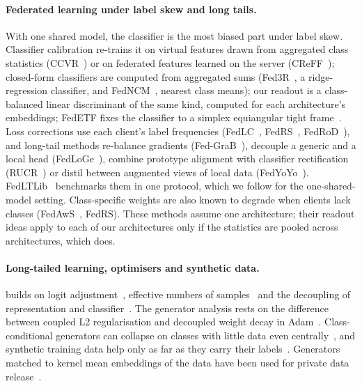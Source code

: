 \paragraph{Federated learning under label skew and long tails.} With one shared model, the classifier is the most
biased part under label skew. Classifier calibration re-trains it on virtual features drawn from aggregated class
statistics (CCVR~\cite{luo2021ccvr}) or on federated features learned on the server (CReFF~\cite{shang2022creff});
closed-form classifiers are computed from aggregated sums (Fed3R~\cite{fani2024fed3r}, a ridge-regression classifier,
and FedNCM~\cite{legate2023fedncm}, nearest class means); our readout is a class-balanced linear discriminant of the same
kind, computed for each architecture's embeddings; FedETF fixes the classifier to a simplex equiangular tight
frame~\cite{li2023fedetf}. Loss corrections use each client's label frequencies (FedLC~\cite{zhang2022fedlc},
FedRS~\cite{li2021fedrs}, FedRoD~\cite{chen2022fedrod}), and long-tail methods re-balance gradients
(Fed-GraB~\cite{xiao2023fedgrab}), decouple a generic and a local head (FedLoGe~\cite{xiao2024fedloge}), combine prototype
alignment with classifier rectification (RUCR~\cite{huang2024rucr}) or distil between augmented views of local data
(FedYoYo~\cite{yan2025fedyoyo}). FedLTLib~\cite{lin2026fedltlib} benchmarks them in one protocol, which we follow for
the one-shared-model setting. Class-specific weights are also known to degrade when clients lack classes
(FedAwS~\cite{yu2020fedaws}, FedRS). These methods assume one architecture; their readout ideas apply to each of our
architectures only if the statistics are pooled across architectures, which \ours does.

\paragraph{Long-tailed learning, optimisers and synthetic data.} \ours builds on logit adjustment~\cite{menon2021la},
effective numbers of samples~\cite{cui2019cb} and the decoupling of representation and
classifier~\cite{kang2020decoupling}. The generator analysis rests on the difference between coupled L2 regularisation
and decoupled weight decay in Adam~\cite{loshchilov2019adamw,kingma2015adam}. Class-conditional generators can collapse
on classes with little data even centrally~\cite{shahbazi2022collapse}, and synthetic training data help only as far
as they carry their labels~\cite{ravuri2019cas}. Generators matched to kernel mean embeddings of the data have been used
for private data release~\cite{harder2021dpmerf}.

